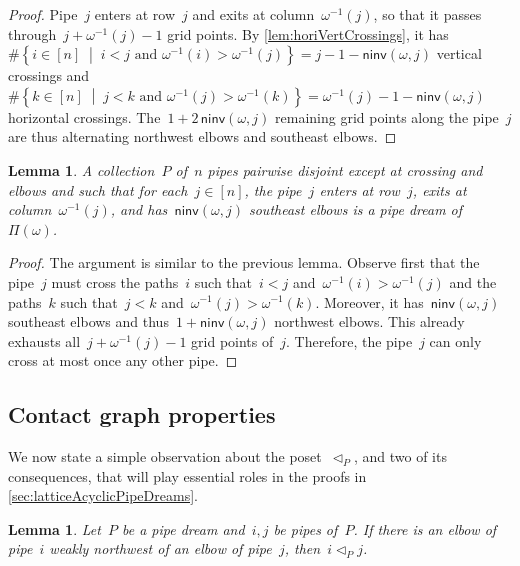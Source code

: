 \documentclass{amsart}
\newtheorem{lemma}[theorem]{Lemma}
\theoremstyle{definition}
\newcommand{\set}[2]{\left\{ #1 \;\middle|\; #2 \right\}} %
\newcommand{\pipeDreams}{\Pi} %
\newcommand{\noninversions}[2]{\mathsf{ninv}(#1,#2)} %
\newcommand{\less}{\vartriangleleft} %
\newcommand{\contactLess}[1]{\less_{#1}} %
\begin{document}
\begin{proof}
Pipe~$j$ enters at row~$j$ and exits at column~$\omega^{-1}(j)$, so that it passes through~$j+\omega^{-1}(j)-1$ grid points.
By \cref{lem:horiVertCrossings}, it has~$\#\set{i \in [n]}{i < j \text{ and } \omega^{-1}(i) > \omega^{-1}(j)} = j-1-\noninversions{\omega}{j}$ vertical crossings and~$\#\set{k \in [n]}{j < k \text{ and } \omega^{-1}(j) > \omega^{-1}(k)} = \omega^{-1}(j)-1-\noninversions{\omega}{j}$ horizontal crossings.
The~$1+2\,\noninversions{\omega}{j}$ remaining grid points along the pipe~$j$ are thus alternating northwest elbows and southeast elbows.
\end{proof}

\begin{lemma}
\label{lem:characterizationPipeDreams}
A collection~$P$ of~$n$ pipes pairwise disjoint except at crossing and elbows and such that for each~$j \in [n]$, the pipe~$j$ enters at row~$j$, exits at column~$\omega^{-1}(j)$, and has~$\noninversions{\omega}{j}$ southeast elbows is a pipe dream of~$\pipeDreams(\omega)$.
\end{lemma}

\begin{proof}
The argument is similar to the previous lemma.
Observe first that the pipe~$j$ must cross the paths~$i$ such that~$i < j$ and~$\omega^{-1}(i) > \omega^{-1}(j)$ and the paths~$k$ such that~$j < k$ and~$\omega^{-1}(j) > \omega^{-1}(k)$.
Moreover, it has~$\noninversions{\omega}{j}$ southeast elbows and thus~$1+\noninversions{\omega}{j}$ northwest elbows.
This already exhausts all~$j+\omega^{-1}(j)-1$ grid points of~$j$.
Therefore, the pipe~$j$ can only cross at most once any other pipe.
\end{proof}


\subsection{Contact graph properties}
\label{subsec:contactGraph}

We now state a simple observation about the poset~$\contactLess{P}$, and two of its consequences, that will play essential roles in the proofs in \cref{sec:latticeAcyclicPipeDreams}.

\begin{lemma}
\label{lem:rectangle}
Let~$P$ be a pipe dream and~$i,j$ be pipes of~$P$.
If there is an elbow of pipe~$i$ weakly northwest of an elbow of pipe~$j$, then~$i \contactLess{P} j$.
\end{lemma}
\end{document}
